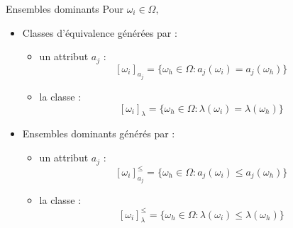 \documentclass[usenames,dvipsnames]{beamer}
\begin{document}
\begin{frame}{Ensembles dominants}
Pour $\omega_i \in \Omega,$
\begin{itemize}
\item Classes d'équivalence générées par : 
\begin{itemize}
\item un attribut $a_j$ : $$[\omega_i]_{a_j} = \{\omega_h \in \Omega : a_j(\omega_i) = a_j(\omega_h)\}$$
\item la classe : $$[\omega_i]_{\lambda} = \{\omega_h \in \Omega : \lambda(\omega_i) = \lambda(\omega_h)\}$$
\end{itemize}

\item Ensembles dominants générés par :
\begin{itemize}
\item un attribut $a_j$ : $$[\omega_i]^{\leq}_{a_j} = \{\omega_h \in \Omega : a_j(\omega_i) \leq a_j(\omega_h)\}$$
\item la classe : $$[\omega_i]^{\leq}_{\lambda} = \{\omega_h \in \Omega : \lambda(\omega_i) \leq \lambda(\omega_h)\}$$
\end{itemize}

\end{itemize}
\end{frame}

%
%
%
%
%
%
%
%
\end{document}
